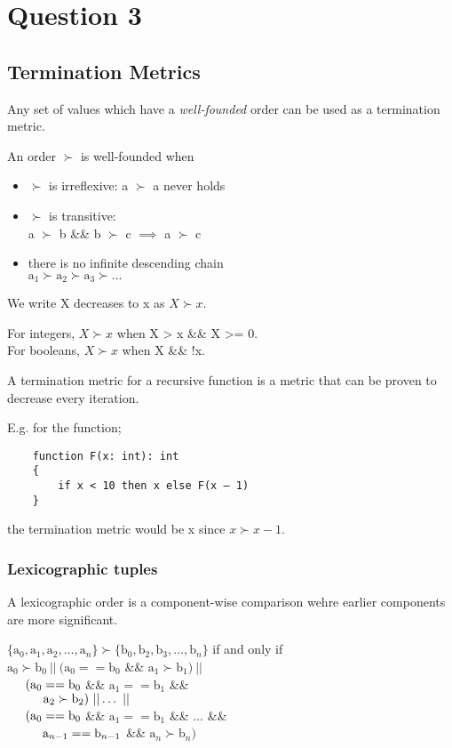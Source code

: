 \section{Question 3}
\subsection{Termination Metrics}
Any set of values which have a \textit{well-founded} order can be used as a termination metric.

An order $\succ$ is well-founded when
\begin{itemize}
    \item $\succ$ is irreflexive: a $\succ$ a never holds
    \item $\succ$ is transitive:\\
        \tab a $\succ$ b \&\& b $\succ$ c $\implies$ a $\succ$ c
    \item there is no infinite descending chain\\
        \tab $\text{a}_1 \succ \text{a}_2  \succ \text{a}_3  \succ \dots$
\end{itemize}

We write X decreases to x as $X \succ x$.

For integers, $X \succ x$ when X > x \&\& X >= 0. \\
For booleans, $X \succ x$ when X \&\& !x.

A termination metric for a recursive function is a metric that can be proven to decrease every iteration.

E.g. for the function;
\begin{verbatim}
    function F(x: int): int 
    { 
        if x < 10 then x else F(x – 1)
    }
\end{verbatim}
the termination metric would be x since $x \succ x - 1$.

\subsubsection{Lexicographic tuples}
A lexicographic order is a component-wise comparison wehre earlier components are more significant.

$\{\text{a}_0, \text{a}_1, \text{a}_2, \dots, \text{a}_n\} \succ \{\text{b}_0, \text{b}_2, \text{b}_3, \dots, \text{b}_n\}$ if and only if\\
$\text{a}_0 \succ \text{b}_0\ ||\ (\text{a}_0 == \text{b}_0$ \&\& $\text{a}_1 \succ \text{b}_1)\ ||$\\
$\hspace*{0.5cm} (\text{a}_0 == \text{b}_0$ \&\& $\text{a}_1 == \text{b}_1$ \&\&\\
$\tab \tab \text{a}_2 \succ \text{b}_2)\ || \dots\ ||$\\
$\hspace*{0.5cm} (\text{a}_0 == \text{b}_0$ \&\& $\text{a}_1 == \text{b}_1$ \&\& $\dots$ \&\&\\
$\tab \tab \text{a}_{n-1} == \text{b}_{n-1}$ \&\& $\text{a}_n \succ \text{b}_n)$

